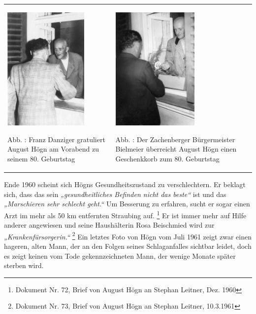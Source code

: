 \documentclass[a4paper]{article}
\newcommand\textstyleZitate[1]{\textit{#1}}
\newcommand\textstyleFootnoteSymbol[1]{\textsuperscript{#1}}
\newcounter{Abb}
\renewcommand\theAbb{\arabic{Abb}}
\begin{document}
\begin{center}
\begin{minipage}{9.146cm}
\begin{center}
\tablefirsthead{}
\tablehead{}
\tabletail{}
\tablelasttail{}
\begin{supertabular}{m{4.309cm}m{4.4370003cm}}

\includegraphics[width=4.128cm,height=6.071cm]{pictures/zulassungsarbeit-img054.jpg}

Abb. \stepcounter{Abb}{\theAbb}: Franz Danziger gratuliert August Högn
am Vorabend zu seinem 80. Geburtstag &

\includegraphics[width=4.255cm,height=6.073cm]{pictures/zulassungsarbeit-img055.jpg}

Abb. \stepcounter{Abb}{\theAbb}: Der Zachenberger Bürgermeister
Bielmeier überreicht August Högn einen Geschenkkorb zum 80.
Geburtstag\\
\end{supertabular}
\end{center}
\end{minipage}
\end{center}
Ende 1960 scheint sich Högns Gesundheitszustand zu verschlechtern. Er
beklagt sich, dass das sein \textstyleZitate{„gesundheitliches Befinden
nicht das beste“} ist und das \textstyleZitate{„Marschieren sehr
schlecht geht.“ }Um Besserung zu erfahren, sucht er sogar einen Arzt im
mehr als 50 km entfernten Straubing auf. \footnote{Dokument Nr. 72,
Brief von August Högn an Stephan Leitner, Dez. 1960} Er ist immer mehr
auf Hilfe anderer angewiesen und seine Haushälterin Rosa Beischmied
wird zur \textstyleZitate{„Krankenfürsorgerin.“ } \footnote{Dokument
Nr. 73, Brief von August Högn an Stephan Leitner,
10.3.1961}\textstyleFootnoteSymbol{ }Ein letztes Foto von Högn vom Juli
1961 zeigt zwar einen hageren, alten Mann, der an den Folgen seines
Schlaganfalles sichtbar leidet, doch es zeigt keinen vom Tode
gekennzeichneten Mann, der wenige Monate später sterben wird.
\end{document}
